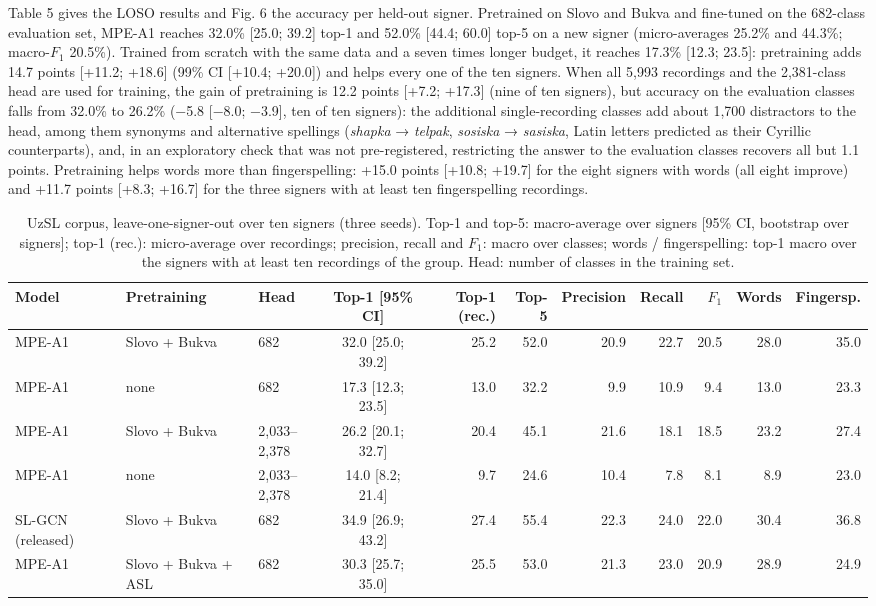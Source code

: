 Table 5 gives the LOSO results and Fig. 6 the accuracy per held-out signer. Pretrained on Slovo and Bukva and fine-tuned on the 682-class evaluation set, MPE-A1 reaches 32.0\% {[}25.0; 39.2{]} top-1 and 52.0\% {[}44.4; 60.0{]} top-5 on a new signer (micro-averages 25.2\% and 44.3\%; macro-\(F_1\) 20.5\%). Trained from scratch with the same data and a seven times longer budget, it reaches 17.3\% {[}12.3; 23.5{]}: pretraining adds 14.7 points {[}+11.2; +18.6{]} (99\% CI {[}+10.4; +20.0{]}) and helps every one of the ten signers. When all 5,993 recordings and the 2,381-class head are used for training, the gain of pretraining is 12.2 points {[}+7.2; +17.3{]} (nine of ten signers), but accuracy on the evaluation classes falls from 32.0\% to 26.2\% (−5.8 {[}−8.0; −3.9{]}, ten of ten signers): the additional single-recording classes add about 1,700 distractors to the head, among them synonyms and alternative spellings (\emph{shapka} → \emph{telpak}, \emph{sosiska} → \emph{sasiska}, Latin letters predicted as their Cyrillic counterparts), and, in an exploratory check that was not pre-registered, restricting the answer to the evaluation classes recovers all but 1.1 points. Pretraining helps words more than fingerspelling: +15.0 points {[}+10.8; +19.7{]} for the eight signers with words (all eight improve) and +11.7 points {[}+8.3; +16.7{]} for the three signers with at least ten fingerspelling recordings.

\begin{table}[t]
\caption{UzSL corpus, leave-one-signer-out over ten signers (three seeds). Top-1 and top-5: macro-average over signers [95\% CI, bootstrap over signers]; top-1 (rec.): micro-average over recordings; precision, recall and $F_1$: macro over classes; words / fingerspelling: top-1 macro over the signers with at least ten recordings of the group. Head: number of classes in the training set.}\label{tab:loso}
\scriptsize\setlength{\tabcolsep}{3pt}
\centering
\begin{tabular}{lllcrrrrrrr}
\toprule
\textbf{Model} & \textbf{Pretraining} & \textbf{Head} & \textbf{Top-1 [95\% CI]} & \textbf{Top-1 (rec.)} & \textbf{Top-5} & \textbf{Precision} & \textbf{Recall} & \textbf{$F_1$} & \textbf{Words} & \textbf{Fingersp.} \\
\midrule
MPE-A1 & Slovo + Bukva & 682 & 32.0 [25.0; 39.2] & 25.2 & 52.0 & 20.9 & 22.7 & 20.5 & 28.0 & 35.0 \\
MPE-A1 & none & 682 & 17.3 [12.3; 23.5] & 13.0 & 32.2 & 9.9 & 10.9 & 9.4 & 13.0 & 23.3 \\
MPE-A1 & Slovo + Bukva & 2,033–2,378 & 26.2 [20.1; 32.7] & 20.4 & 45.1 & 21.6 & 18.1 & 18.5 & 23.2 & 27.4 \\
MPE-A1 & none & 2,033–2,378 & 14.0 [8.2; 21.4] & 9.7 & 24.6 & 10.4 & 7.8 & 8.1 & 8.9 & 23.0 \\
SL-GCN (released) & Slovo + Bukva & 682 & 34.9 [26.9; 43.2] & 27.4 & 55.4 & 22.3 & 24.0 & 22.0 & 30.4 & 36.8 \\
MPE-A1 & Slovo + Bukva + ASL & 682 & 30.3 [25.7; 35.0] & 25.5 & 53.0 & 21.3 & 23.0 & 20.9 & 28.9 & 24.9 \\
\bottomrule
\end{tabular}
\end{table}

